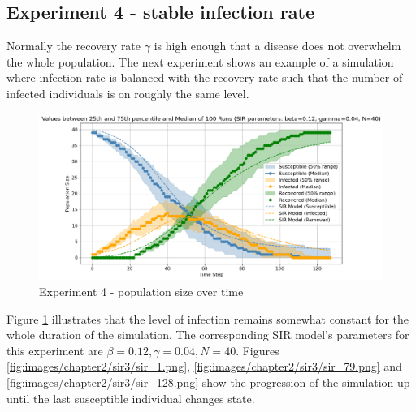 \subsection{Experiment 4 - stable infection rate}

Normally the recovery rate $\gamma$ is high enough that a disease does not overwhelm the whole population.
The next experiment shows an example of a simulation where infection rate is balanced with the recovery rate such that the number of infected individuals is on roughly the same level.


\begin{figure}[H]
    \centering
    \includegraphics[width=1.0\textwidth]{images/chapter2/experiment3.png}
    \caption{Experiment 4 - population size over time}\label{fig:images/chapter2/experiment3.png}
\end{figure}


Figure \ref{fig:images/chapter2/experiment3.png} illustrates that the level of infection remains somewhat constant for the whole duration of the simulation.
The corresponding SIR model's parameters for this experiment are $\beta = 0.12, \gamma = 0.04, N = 40$.
Figures \ref{fig:images/chapter2/sir3/sir_1.png}, \ref{fig:images/chapter2/sir3/sir_79.png} and \ref{fig:images/chapter2/sir3/sir_128.png} show the progression of the simulation up until the last susceptible individual changes state.

